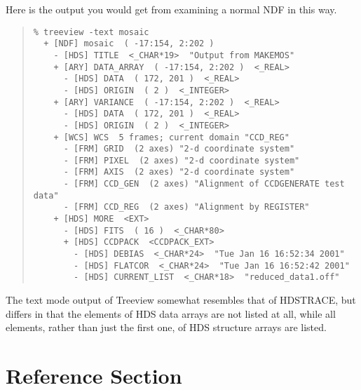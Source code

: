 \documentclass[twoside,11pt]{article}
\newcommand{\xref}[3]{#1}
\renewcommand{\_}{\texttt{\symbol{95}}}
\begin{document}
Here is the output you would get from examining a normal NDF in this way.
\begin{quote}
\begin{verbatim}
% treeview -text mosaic
  + [NDF] mosaic  ( -17:154, 2:202 )
    - [HDS] TITLE  <_CHAR*19>  "Output from MAKEMOS"
    + [ARY] DATA_ARRAY  ( -17:154, 2:202 )  <_REAL>
      - [HDS] DATA  ( 172, 201 )  <_REAL>
      - [HDS] ORIGIN  ( 2 )  <_INTEGER>
    + [ARY] VARIANCE  ( -17:154, 2:202 )  <_REAL>
      - [HDS] DATA  ( 172, 201 )  <_REAL>
      - [HDS] ORIGIN  ( 2 )  <_INTEGER>
    + [WCS] WCS  5 frames; current domain "CCD_REG"
      - [FRM] GRID  (2 axes) "2-d coordinate system"
      - [FRM] PIXEL  (2 axes) "2-d coordinate system"
      - [FRM] AXIS  (2 axes) "2-d coordinate system"
      - [FRM] CCD_GEN  (2 axes) "Alignment of CCDGENERATE test data"
      - [FRM] CCD_REG  (2 axes) "Alignment by REGISTER"
    + [HDS] MORE  <EXT>
      - [HDS] FITS  ( 16 )  <_CHAR*80>
      + [HDS] CCDPACK  <CCDPACK_EXT>
        - [HDS] DEBIAS  <_CHAR*24>  "Tue Jan 16 16:52:34 2001"
        - [HDS] FLATCOR  <_CHAR*24>  "Tue Jan 16 16:52:42 2001"
        - [HDS] CURRENT_LIST  <_CHAR*18>  "reduced_data1.off"
\end{verbatim}
\end{quote}

The text mode output of Treeview somewhat resembles that of 
\xref{HDSTRACE}{sun102}{}, but differs in that the elements of
HDS data arrays are not listed at all, while all elements,
rather than just the first one, of HDS structure arrays are listed.

\newpage
\appendix
\section{Reference Section}
\end{document}
